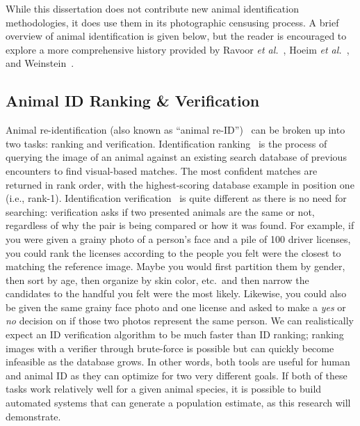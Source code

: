 While this dissertation does not contribute new animal identification methodologies, it does use them in its photographic censusing process.  A brief overview of animal identification is given below, but the reader is encouraged to explore a more comprehensive history provided by Ravoor \textit{et al.}~\cite{ravoor_deep_2020}, Hoeim \textit{et al.}~\cite{hoiem_diagnosing_2012}, and Weinstein~\cite{weinstein_computer_2018}.

\subsection{Animal ID Ranking \& Verification}\label{sec:id_verification}

Animal re-identification (also known as ``animal re-ID'')~\cite{cheema_automatic_2017} can be broken up into two tasks: ranking and verification.  Identification ranking~\cite{crall_hotspotter_2013,weideman_integral_2017,moskvyak_robust_2019,matthe_comparison_2017} is the process of querying the image of an animal against an existing search database of previous encounters to find visual-based matches.  The most confident matches are returned in rank order, with the highest-scoring database example in position one (i.e., rank-1).  Identification verification~\cite{mandal_prediction_2010,lu_surpassing_2015,sengupta_frontal_2016,ramanathan_face_2006,taigman_deepface_2014,kumar_attribute_2009} is quite different as there is no need for searching: verification asks if two presented animals are the same or not, regardless of why the pair is being compared or how it was found.  For example, if you were given a grainy photo of a person's face and a pile of 100 driver licenses, you could rank the licenses according to the people you felt were the closest to matching the reference image.  Maybe you would first partition them by gender, then sort by age, then organize by skin color, etc.\ and then narrow the candidates to the handful you felt were the most likely.  Likewise, you could also be given the same grainy face photo and one license and asked to make a \textit{yes} or \textit{no} decision on if those two photos represent the same person.  We can realistically expect an ID verification algorithm to be much faster than ID ranking; ranking images with a verifier through brute-force is possible but can quickly become infeasible as the database grows.  In other words, both tools are useful for human and animal ID as they can optimize for two very different goals.  If both of these tasks work relatively well for a given animal species, it is possible to build automated systems that can generate a population estimate, as this research will demonstrate.

